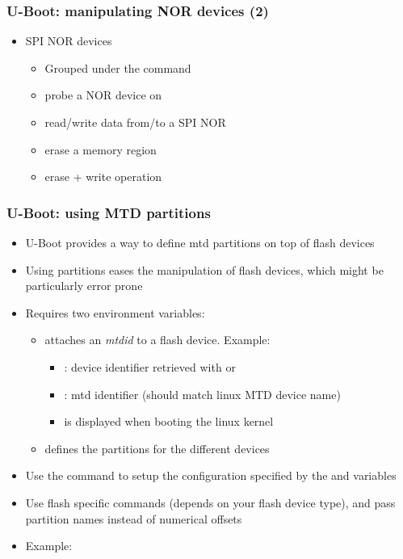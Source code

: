 \begin{frame}
  \frametitle{U-Boot: manipulating NOR devices (2)}
  \begin{itemize}
  \item SPI NOR devices
    \begin{itemize}
    \item Grouped under the  command
    \item {} probe a NOR device on
    \item {} read/write data
       from/to a SPI NOR
    \item {} erase a memory region
    \item {} erase + write operation
    \end{itemize}
  \end{itemize}
\end{frame}

\begin{frame}
  \frametitle{U-Boot: using MTD partitions}
  \begin{itemize}
  \item U-Boot provides a way to define mtd partitions on top of flash
    devices
  \item Using partitions eases the manipulation of flash devices, which might
    be particularly error prone
  \item Requires two environment variables:
    \begin{itemize}
    \item {} attaches an {\em mtdid} to a flash device.
      Example: 
      \begin{itemize}
      \item {}: device identifier retrieved with
         or 
      \item {}: mtd identifier (should match linux MTD device
        name)
      \item {} is displayed when booting the linux kernel
      \end{itemize}
    \item {} defines the partitions for the different devices
    \end{itemize}
  \item Use the  command to setup the configuration
    specified by the  and  variables
  \item Use flash specific commands (depends on your flash device type),
    and pass partition names instead of numerical offsets
  \item Example: 
  \end{itemize}
\end{frame}


